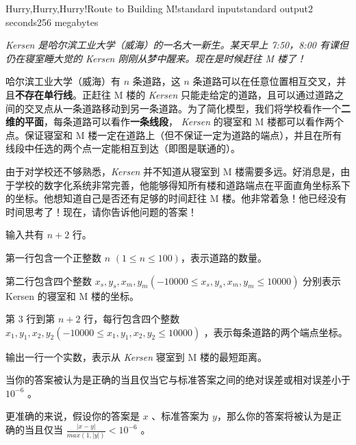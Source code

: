 \documentclass[12pt,a4paper,oneside]{article}
\begin{document}
    \begin{problem}{Hurry,Hurry,Hurry!Route to Building M!}{standard input}{standard output}{2 seconds}{256 megabytes}
	
        \textit{Kersen 是哈尔滨工业大学（威海）的一名大一新生。某天早上 7:50，8:00 有课但仍在寝室睡大觉的 Kersen 刚刚从梦中醒来。现在是时候赶往 M 楼了！}
        
        哈尔滨工业大学（威海）有 $n$ 条道路，这 $n$ 条道路可以在任意位置相互交叉，并且\textbf{不存在单行线}。正赶往 M 楼的 \textit{Kersen} 只能走给定的道路，且可以通过道路之间的交叉点从一条道路移动到另一条道路。为了简化模型，我们将学校看作一个\textbf{二维的平面}，每条道路可以看作\textbf{一条线段}， \textit{Kersen} 的寝室和 M 楼都可以看作两个点。保证寝室和 M 楼一定在道路上（但不保证一定为道路的端点），并且在所有线段中任选的两个点一定能相互到达（即图是联通的）。
        
        由于对学校还不够熟悉，\textit{Kersen} 并不知道从寝室到 M 楼需要多远。好消息是，由于学校的数字化系统非常完善，他能够得知所有楼和道路端点在平面直角坐标系下的坐标。他想知道自己是否还有足够的时间赶往 M 楼。他非常着急！他已经没有时间思考了！现在，请你告诉他问题的答案！
	
	\InputFile
	
	输入共有 $n+2$ 行。
        
        第一行包含一个正整数 $n$ $(1 \leq n \leq 100)$，表示道路的数量。
        
        第二行包含四个整数 $x_s, y_s, x_m, y_m (-10000 \leq x_s, y_s,x_m,y_m \leq 10000)$ 分别表示 Kersen 的寝室和 M 楼的坐标。 
        
        第 $3$ 行到第 $n+2$ 行，每行包含四个整数 $x_1, y_1, x_2, y_2 (-10000 \leq x_1, y_1,x_2,y_2 \leq 10000)$ ，表示每条道路的两个端点坐标。  
	
	\OutputFile
	
	输出一行一个实数，表示从 \textit{Kersen} 寝室到 M 楼的最短距离。

        当你的答案被认为是正确的当且仅当它与标准答案之间的绝对误差或相对误差小于 $10^{-6}$ 。

        更准确的来说，假设你的答案是 $x$ 、标准答案为 $y$，那么你的答案将被认为是正确的当且仅当 $\frac{|x-y|}{max(1,|y|)} < 10^{-6}$ 。
	
	\Example
	
	\begin{example}
	\end{example}
	

\end{problem}
\end{document}
